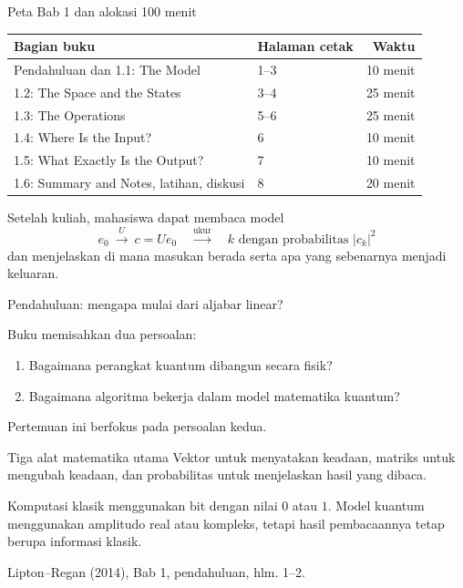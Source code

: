 \documentclass[aspectratio=169,11pt]{beamer}
\newcommand{\bookref}[1]{\par\vfill{\scriptsize\color{gray}Lipton--Regan (2014), Bab 1, #1.}}
\begin{document}
\begin{frame}{Peta Bab 1 dan alokasi 100 menit}

\small
\begin{tabular}{p{6.7cm}p{2.7cm}r}
\toprule
Bagian buku & Halaman cetak & Waktu\\\midrule
Pendahuluan dan 1.1: The Model & 1--3 & 10 menit\\
1.2: The Space and the States & 3--4 & 25 menit\\
1.3: The Operations & 5--6 & 25 menit\\
1.4: Where Is the Input? & 6 & 10 menit\\
1.5: What Exactly Is the Output? & 7 & 10 menit\\
1.6: Summary and Notes, latihan, diskusi & 8 & 20 menit\\\bottomrule
\end{tabular}
\par\medskip
\normalsize
Setelah kuliah, mahasiswa dapat membaca model
\[
 e_0\ \xrightarrow{\ U\ }\ c=Ue_0
 \quad\xrightarrow{\text{ukur}}\quad
 k\text{ dengan probabilitas }|c_k|^2
\]
dan menjelaskan di mana masukan berada serta apa yang sebenarnya menjadi keluaran.

\end{frame}

\begin{frame}{Pendahuluan: mengapa mulai dari aljabar linear?}

Buku memisahkan dua persoalan:
\begin{enumerate}
\item Bagaimana perangkat kuantum dibangun secara fisik?
\item Bagaimana algoritma bekerja dalam model matematika kuantum?
\end{enumerate}
Pertemuan ini berfokus pada persoalan kedua.
\begin{block}{Tiga alat matematika utama}
Vektor untuk menyatakan keadaan, matriks untuk mengubah keadaan, dan probabilitas untuk menjelaskan hasil yang dibaca.
\end{block}
Komputasi klasik menggunakan bit dengan nilai $0$ atau $1$. Model kuantum menggunakan amplitudo real atau kompleks, tetapi hasil pembacaannya tetap berupa informasi klasik.
\bookref{pendahuluan, hlm. 1--2}

\end{frame}
\end{document}
